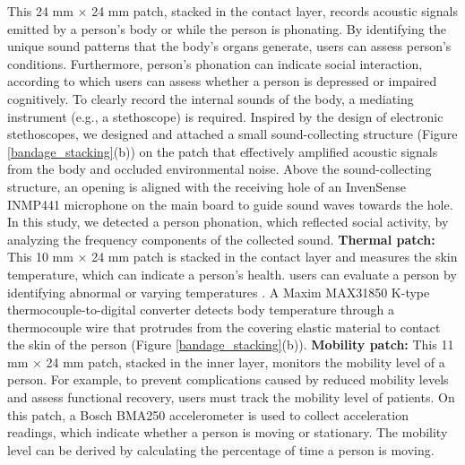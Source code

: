 This 24 mm × 24 mm patch, stacked in the contact layer, records acoustic signals emitted by a person's body or while the person is phonating. By identifying the unique sound patterns that the body's organs generate, users can assess person's conditions. Furthermore, person's phonation can indicate social interaction, according to which users can assess whether a person is depressed or impaired cognitively.  To clearly record the internal sounds of the body, a mediating instrument (e.g., a stethoscope) is required. Inspired by the design of electronic stethoscopes, we designed and attached a small sound-collecting structure (Figure \ref{bandage_stacking}(b)) on the patch that effectively amplified acoustic signals from the body and occluded environmental noise. Above the sound-collecting structure, an opening is aligned with the receiving hole of an InvenSense INMP441 microphone on the main board to guide sound waves towards the hole. In this study, we detected a person phonation, which reflected social activity, by analyzing the frequency components of the collected sound.
\vspace{10pt}
\newline
\textbf{Thermal patch:}
\newline
This 10 mm × 24 mm patch is stacked in the contact layer and measures the skin temperature, which can indicate a person's health. users can evaluate a person by identifying abnormal or varying temperatures \cite{Freitas1999}. A Maxim MAX31850 K-type thermocouple-to-digital converter detects body temperature through a thermocouple wire that protrudes from the covering elastic material to contact the skin of the person (Figure \ref{bandage_stacking}(b)).
\vspace{10pt}
\newpage
\textbf{Mobility patch:}
\newline
This 11 mm × 24 mm patch, stacked in the inner layer, monitors the mobility level of a person. For example, to prevent complications caused by reduced mobility levels and assess functional recovery, users must track the mobility level of patients. On this patch, a Bosch BMA250 accelerometer is used to collect acceleration readings, which indicate whether a person is moving or stationary. The mobility level can be derived by calculating the percentage of time a person is moving.
\vspace{10pt}

